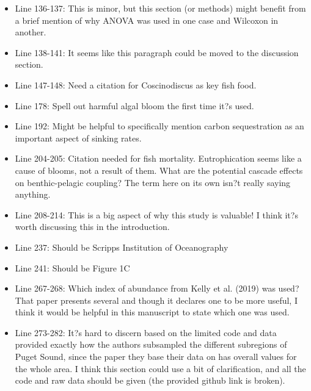 \documentclass[11pt]{article}
\begin{document}
\begin{linenumbers}
\begin{itemize}
\item{Line 136-137: This is minor, but this section (or methods) might benefit from a brief mention of why ANOVA was used in one case and Wilcoxon in another.}

\item{Line 138-141: It seems like this paragraph could be moved to the discussion section.}

\item{Line 147-148: Need a citation for Coscinodiscus as key fish food.}

\item{Line 178: Spell out harmful algal bloom the first time it?s used.}

\item{Line 192: Might be helpful to specifically mention carbon sequestration as an important aspect of sinking rates.}

\item{Line 204-205: Citation needed for fish mortality. Eutrophication seems like a cause of blooms, not a result of them. What are the potential cascade effects on benthic-pelagic coupling? The term here on its own isn?t really saying anything.}

\item{Line 208-214: This is a big aspect of why this study is valuable! I think it?s worth discussing this in the introduction.}

\item{Line 237: Should be Scripps Institution of Oceanography}

\item{Line 241: Should be Figure 1C}

\item{Line 267-268: Which index of abundance from Kelly et al. (2019) was used? That paper presents several and though it declares one to be more useful, I think it would be helpful in this manuscript to state which one was used.}

\item{Line 273-282: It?s hard to discern based on the limited code and data provided exactly how the authors subsampled the different subregions of Puget Sound, since the paper they base their data on has overall values for the whole area. I think this section could use a bit of clarification, and all the code and raw data should be given (the provided github link is broken).}

\end{itemize}
 \end{linenumbers}
\end{document}
